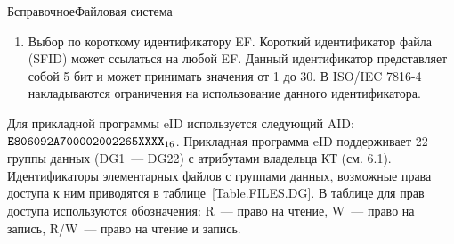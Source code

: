 \begin{appendix}{Б}{справочное}{Файловая система}
\begin{enumerate}
\item
Выбор по короткому идентификатору EF. Короткий идентификатор 
файла (SFID) может ссылаться на любой EF. Данный идентификатор 
представляет собой 5 бит и может принимать значения от 1 до 30. В ISO/IEC 
7816-4 накладываются ограничения на использование данного идентификатора. 
\end{enumerate}


Для прикладной программы eID используется следующий AID: 
$\texttt{E806092A700002002265XXXX}_{16}$. 
Прикладная программа eID поддерживает 22 группы 
данных (DG1~--- DG22) с атрибутами владельца КТ (см. 6.1). 
Идентификаторы элементарных файлов с группами данных, 
возможные права доступа к ним приводятся в таблице~\ref{Table.FILES.DG}. 
В таблице для прав доступа используются обозначения: R~--- право на чтение, 
W~--- право на запись, R/W~--- право на чтение и запись.
 

\end{appendix}
